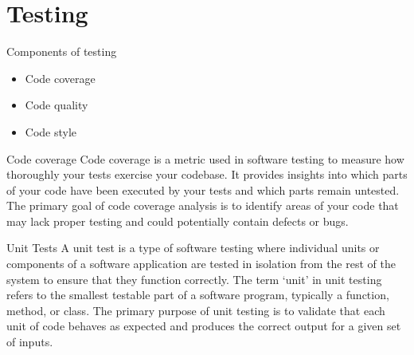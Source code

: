 \section{Testing}
\begin{frame}
    \begin{content}{Components of testing}
        \begin{itemize}
            \item Code coverage
            \item Code quality
            \item Code style
        \end{itemize}
    \end{content}
\end{frame}
\begin{frame}
    \begin{content}{Code coverage}
        Code coverage is a metric used in software testing to measure how thoroughly your tests exercise your codebase. It provides insights into which parts of your code have been executed by your tests and which parts remain untested. The primary goal of code coverage analysis is to identify areas of your code that may lack proper testing and could potentially contain defects or bugs.
    \end{content}
\end{frame}
\begin{frame}
    \begin{content}{Unit Tests}
        A unit test is a type of software testing where individual units or components of a software application are tested in isolation from the rest of the system to ensure that they function correctly. The term `unit' in unit testing refers to the smallest testable part of a software program, typically a function, method, or class. The primary purpose of unit testing is to validate that each unit of code behaves as expected and produces the correct output for a given set of inputs.
    \end{content}
\end{frame}